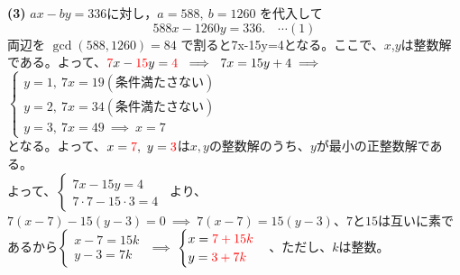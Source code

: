 \documentclass[dvipdfmx,a4paper,12pt]{jsarticle}
\theoremstyle{mystyle}
\begin{document}
\textbf{(3)}\quad
$ax-by=336$に対し，$a=588,\ b=1260$ を代入して
\[
588x-1260y=336.\quad \cdots (1)
\]
両辺を $\gcd(588,1260)=84$ で割ると7x-15y=4となる。ここで、$x$,$y$は整数解である。よって、${\color{red}{7}} x-{\color{red}{15}} y={\color{red}{4}}\ \implies\ 7x=15y+4\implies$\\[0.5em]
$\begin{cases}y=1,\ 7x=19(条件満たさない)\\y=2,\ 7x=34(条件満たさない)\\y=3,\ 7x=49\ \implies\ x=7\end{cases}$\\[0.5em]
となる。よって、$x={\color{red}{7}},\ y={\color{red}{3}} $は$x,y$の整数解のうち、$y$が最小の正整数解である。\\[1em]

\noindent
よって、$\begin{cases}7x-15y=4\\7\cdot 7-15\cdot 3=4\end{cases}$\ より、$7(x-7)-15(y-3)=0\ \implies\ 7(x-7)=15(y-3)$、$7$と$15$は互いに素であるから$\begin{cases}x-7=15k\\y-3=7k\end{cases}$ $\implies$ $\begin{cases}x={\color{red}{7+15k}}\\y={\color{red}{3+7k}}\end{cases}$、ただし、$k$は整数。
\end{document}
